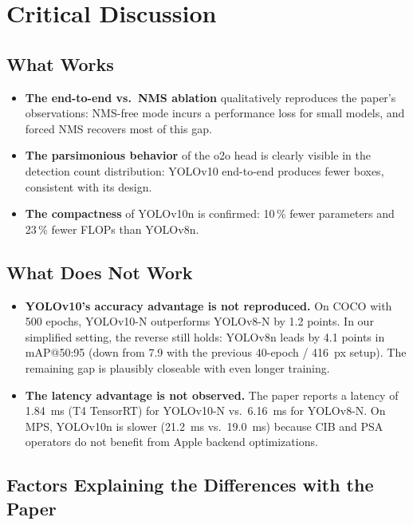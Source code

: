 \documentclass[11pt,a4paper]{article}
\begin{document}
\section{Critical Discussion}

\subsection{What Works}

\begin{itemize}[noitemsep]
  \item \textbf{The end-to-end vs.\ NMS ablation} qualitatively reproduces the paper's observations: NMS-free mode incurs a performance loss for small models, and forced NMS recovers most of this gap.
  \item \textbf{The parsimonious behavior} of the o2o head is clearly visible in the detection count distribution: YOLOv10 end-to-end produces fewer boxes, consistent with its design.
  \item \textbf{The compactness} of YOLOv10n is confirmed: 10\,\% fewer parameters and 23\,\% fewer FLOPs than YOLOv8n.
\end{itemize}

\subsection{What Does Not Work}

\begin{itemize}[noitemsep]
  \item \textbf{YOLOv10's accuracy advantage is not reproduced.} On COCO with 500 epochs, YOLOv10-N outperforms YOLOv8-N by 1.2 points. In our simplified setting, the reverse still holds: YOLOv8n leads by 4.1 points in mAP@50:95 (down from 7.9 with the previous 40-epoch / 416~px setup). The remaining gap is plausibly closeable with even longer training.
  \item \textbf{The latency advantage is not observed.} The paper reports a latency of 1.84~ms (T4 TensorRT) for YOLOv10-N vs.\ 6.16~ms for YOLOv8-N. On MPS, YOLOv10n is slower (21.2~ms vs.\ 19.0~ms) because CIB and PSA operators do not benefit from Apple backend optimizations.
\end{itemize}

\subsection{Factors Explaining the Differences with the Paper}
\end{document}
